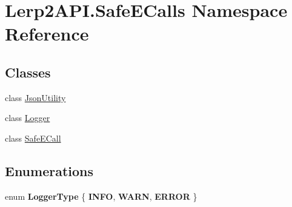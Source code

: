 \hypertarget{namespace_lerp2_a_p_i_1_1_safe_e_calls}{}\section{Lerp2\+A\+P\+I.\+Safe\+E\+Calls Namespace Reference}
\label{namespace_lerp2_a_p_i_1_1_safe_e_calls}
\subsection*{Classes}
\begin{DoxyCompactItemize}
\item 
class \hyperlink{class_lerp2_a_p_i_1_1_safe_e_calls_1_1_json_utility}{Json\+Utility}
\item 
class \hyperlink{class_lerp2_a_p_i_1_1_safe_e_calls_1_1_logger}{Logger}
\item 
class \hyperlink{class_lerp2_a_p_i_1_1_safe_e_calls_1_1_safe_e_call}{Safe\+E\+Call}
\end{DoxyCompactItemize}
\subsection*{Enumerations}
\begin{DoxyCompactItemize}
\item 
\mbox{\label{namespace_lerp2_a_p_i_1_1_safe_e_calls_a6a0ca549f40345fd248d66346dfe1d70}} 
enum {\bfseries Logger\+Type} \{ {\bfseries I\+N\+FO}, 
{\bfseries W\+A\+RN}, 
{\bfseries E\+R\+R\+OR}
 \}
\end{DoxyCompactItemize}

